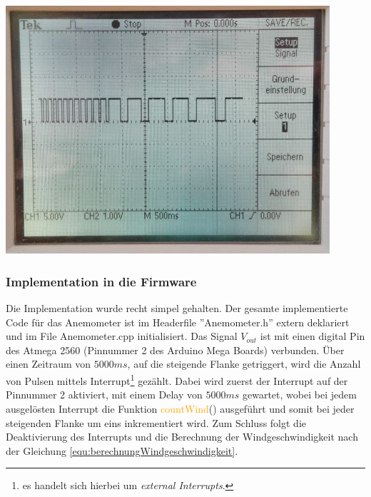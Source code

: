 \begin{minipage}{0.44\textwidth}
\centering
\includegraphics[width = 0.9\textwidth]{graphics/Anemometer/oszilloskop_anenometer_puls.png}
\label{fig:rechteckpuls_anemometer}
\end{minipage}
\newpage

\subsubsection{Implementation in die Firmware}
Die Implementation wurde recht simpel gehalten. Der gesamte implementierte Code für das Anemometer ist im Headerfile ''Anemometer.h'' extern deklariert und im File Anemometer.cpp initialisiert. Das Signal $V_{out}$ ist mit einen digital Pin des Atmega 2560 (Pinnummer 2 des Arduino Mega Boards) verbunden. Über einen Zeitraum von $5000ms$, auf die steigende Flanke getriggert, wird die Anzahl von Pulsen mittels Interrupt\footnote{es handelt sich hierbei um \textit{external Interrupts}.} gezählt. Dabei wird zuerst der Interrupt auf der Pinnummer 2 aktiviert, mit einem Delay von $5000ms$ gewartet, wobei bei jedem ausgelösten Interrupt die Funktion \textcolor{orange}{countWind}() ausgeführt und somit bei jeder steigenden Flanke um eins inkrementiert wird. Zum Schluss folgt die Deaktivierung des Interrupts und die Berechnung der Windgeschwindigkeit nach der Gleichung \ref{equ:berechnungWindgeschwindigkeit}.\\

